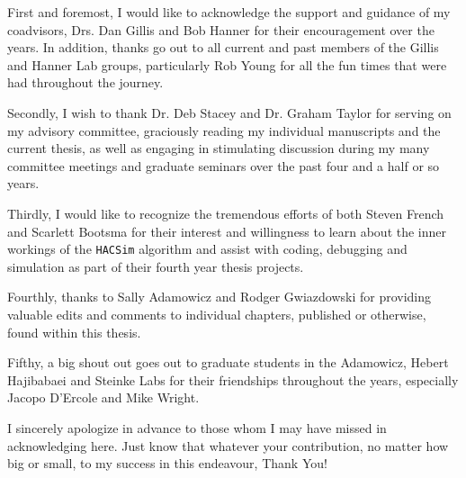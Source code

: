 \begin{acknowledgements}\label{acknow}
\ssp

\noindent First and foremost, I would like to acknowledge the support and guidance of my \\ coadvisors, Drs. Dan Gillis and Bob Hanner for their encouragement over the years. In addition, thanks go out to all current and past members of the Gillis and Hanner Lab groups, particularly Rob Young for all the fun times that were had throughout the journey.

\vspace{5mm}

\noindent Secondly, I wish to thank Dr. Deb Stacey and Dr. Graham Taylor for serving on my advisory committee, graciously reading my individual manuscripts and the current thesis, as well as engaging in stimulating discussion during my many committee meetings and graduate seminars over the past four and a half or so years.

\vspace{5mm}

\noindent Thirdly, I would like to recognize the tremendous efforts of both Steven French and Scarlett Bootsma for their interest and willingness to learn about the inner workings of the {\tt HACSim} algorithm and assist with coding, debugging and simulation as part of their fourth year thesis projects.

\vspace{5mm}

\noindent Fourthly, thanks to Sally Adamowicz and Rodger Gwiazdowski for providing \\ valuable edits and comments to individual chapters, published or otherwise, found within this thesis.

\vspace{5mm}

\noindent Fifthy, a big shout out goes out to graduate students in the Adamowicz, Hebert \\ Hajibabaei and Steinke Labs for their friendships throughout the years, especially Jacopo D'Ercole and Mike Wright.

\vspace{5mm}

\noindent I sincerely apologize in advance to those whom I may have missed in acknowledging here. Just know that whatever your contribution, no matter how big or small, to my success in this endeavour, Thank You!

\vspace{5mm}


\end{acknowledgements}
